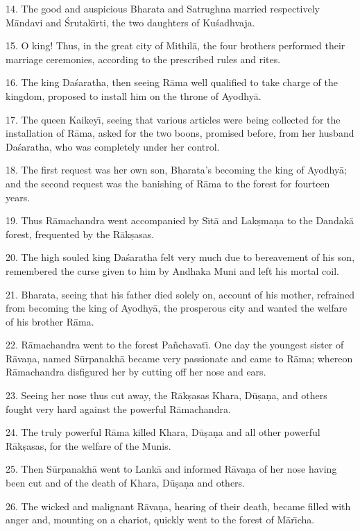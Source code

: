 14. The good and auspicious Bharata and Satrughna married respectively M\=andavi and \'Srutak\={\i}rti, the two daughters of Ku\'sadhvaja.

15. O king! Thus, in the great city of Mithil\=a, the four brothers performed their marriage ceremonies, according to the prescribed rules and rites.

16. The king Da\'saratha, then seeing R\=ama well qualified to take charge of the kingdom, proposed to install him on the throne of Ayodhy\=a.

17. The queen Kaikey\={\i}, seeing that various articles were being collected for the installation of R\=ama, asked for the two boons, promised before, from her husband Da\'saratha, who was completely under her control.

18. The first request was her own son, Bharata's becoming the king of Ayodhy\=a; and the second request was the banishing of R\=ama to the forest for fourteen years.

19. Thus R\=amachandra went accompanied by S\={\i}t\=a and Lak\d{s}ma\d{n}a to the Dandak\=a forest, frequented by the R\=ak\d{s}asas.

20. The high souled king Da\'saratha felt very much due to bereavement of his son, remembered the curse given to him by Andhaka Muni and left his mortal coil.

21. Bharata, seeing that his father died solely on, account of his mother, refrained from becoming the king of Ayodhy\=a, the prosperous city and wanted the welfare of his brother R\=ama.

22. R\=amachandra went to the forest Pa\~nchavat\={\i}. One day the youngest sister of R\=ava\d{n}a, named S\=urpanakh\=a became very passionate and came to R\=ama; whereon R\=amachandra disfigured her by cutting off her nose and ears.

23. Seeing her nose thus cut away, the R\=ak\d{s}asas Khara, D\=u\d{s}a\d{n}a, and others fought very hard against the powerful R\=amachandra.

24. The truly powerful R\=ama killed Khara, D\=u\d{s}a\d{n}a and all other powerful R\=ak\d{s}asas, for the welfare of the Munis.

25. Then S\=urpanakh\=a went to Lank\=a and informed R\=ava\d{n}a of her nose having been cut and of the death of Khara, D\=u\d{s}a\d{n}a and others.

26. The wicked and malignant R\=ava\d{n}a, hearing of their death, became filled with anger and, mounting on a chariot, quickly went to the forest of M\=ar\={\i}cha.

